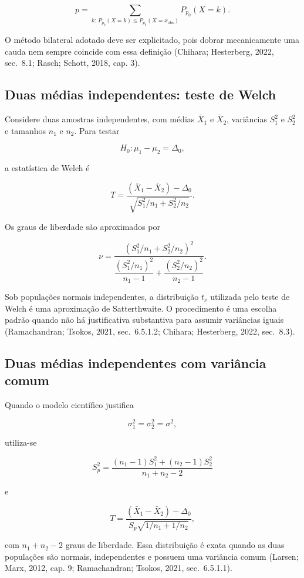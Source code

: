 \documentclass[
  letterpaper,
  DIV=11,
  numbers=noendperiod]{scrreprt}
\begin{document}
\[p
=
\sum_{k:\,P_{p_0}(X=k)\leq P_{p_0}(X=x_{\mathrm{obs}})}
P_{p_0}(X=k).\]

O método bilateral adotado deve ser explicitado, pois dobrar
mecanicamente uma cauda nem sempre coincide com essa definição (Chihara;
Hesterberg, 2022, sec.~8.1; Rasch; Schott, 2018, cap. 3).

\subsection{Duas médias independentes: teste de
Welch}\label{duas-muxe9dias-independentes-teste-de-welch}

Considere duas amostras independentes, com médias \(\bar{X}_1\) e
\(\bar{X}_2\), variâncias \(S_1^2\) e \(S_2^2\) e tamanhos \(n_1\) e
\(n_2\). Para testar

\[H_0:\mu_1-\mu_2=\Delta_0,\]

a estatística de Welch é

\[T
=
\frac{(\bar{X}_1-\bar{X}_2)-\Delta_0}
{\sqrt{S_1^2/n_1+S_2^2/n_2}}.\]

Os graus de liberdade são aproximados por

\[\nu
=
\frac{\left(S_1^2/n_1+S_2^2/n_2\right)^2}
{\dfrac{(S_1^2/n_1)^2}{n_1-1}
+\dfrac{(S_2^2/n_2)^2}{n_2-1}}.\]

Sob populações normais independentes, a distribuição \(t_\nu\) utilizada
pelo teste de Welch é uma aproximação de Satterthwaite. O procedimento é
uma escolha padrão quando não há justificativa substantiva para assumir
variâncias iguais (Ramachandran; Tsokos, 2021, sec.~6.5.1.2; Chihara;
Hesterberg, 2022, sec.~8.3).

\subsection{Duas médias independentes com variância
comum}\label{duas-muxe9dias-independentes-com-variuxe2ncia-comum}

Quando o modelo científico justifica

\[\sigma_1^2=\sigma_2^2=\sigma^2,\]

utiliza-se

\[S_p^2
=
\frac{(n_1-1)S_1^2+(n_2-1)S_2^2}{n_1+n_2-2}\]

e

\[T
=
\frac{(\bar{X}_1-\bar{X}_2)-\Delta_0}
{S_p\sqrt{1/n_1+1/n_2}},\]

com \(n_1+n_2-2\) graus de liberdade. Essa distribuição é exata quando
as duas populações são normais, independentes e possuem uma variância
comum (Larsen; Marx, 2012, cap. 9; Ramachandran; Tsokos, 2021,
sec.~6.5.1.1).
\end{document}
